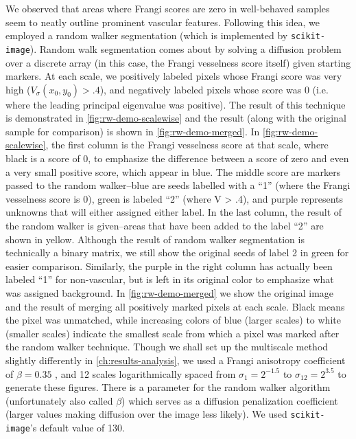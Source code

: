 We observed that areas where Frangi scores are zero in well-behaved samples seem to neatly outline prominent vascular features. Following this idea, we employed a random walker segmentation \cite{Grady-Random-Walks} (which is implemented by \texttt{scikit-image}). Random walk segmentation comes about by solving a diffusion problem over a discrete array (in this case, the Frangi vesselness score itself) given starting markers. At each scale, we positively labeled pixels whose Frangi score was very high ($V_\sigma(x_0,y_0) > .4$), and negatively labeled pixels whose score was $0$ (i.e. where the leading principal eigenvalue was positive). The result of this technique is demonstrated in \cref{fig:rw-demo-scalewise} and the result (along with the original sample for comparison) is shown in \cref{fig:rw-demo-merged}.
In \cref{fig:rw-demo-scalewise}, the first column is the Frangi vesselness score at that scale, where black is a score of 0, to emphasize the difference between a score of zero and even a very small positive score, which appear in blue. The middle score are markers passed to the random walker--blue are seeds labelled with a ``1'' (where the Frangi vesselness score is 0), green is labeled ``2'' (where V > .4), and purple represents unknowns that will either assigned either label. In the last column, the result of the random walker is given--areas that have been added to the label ``2'' are shown in yellow. Although the result of random walker segmentation is technically a binary matrix, we still show the original seeds of label 2 in green for easier comparison. Similarly, the purple in the right column has actually been labeled ``1'' for non-vascular, but is left in its original color to emphasize what was assigned background. In \cref{fig:rw-demo-merged} we show the original image and the result of merging all positively marked pixels at each scale. Black means the pixel was unmatched, while increasing colors of blue (larger scales) to white (smaller scales) indicate the smallest scale from which a pixel was marked after the random walker technique.  Though we shall set up the multiscale method slightly differently in \cref{ch:results-analysis}, we used a Frangi anisotropy coefficient of $\beta=0.35$ , and 12 scales logarithmically spaced from $\sigma_1 = 2^{-1.5} $ to $\sigma_12 = 2^{3.5}$ to generate these figures. There is a parameter for the random walker algorithm (unfortunately also called $\beta$) which serves as a diffusion penalization coefficient (larger values making diffusion over the image less likely). We used \texttt{scikit-image}'s default value of 130. 

